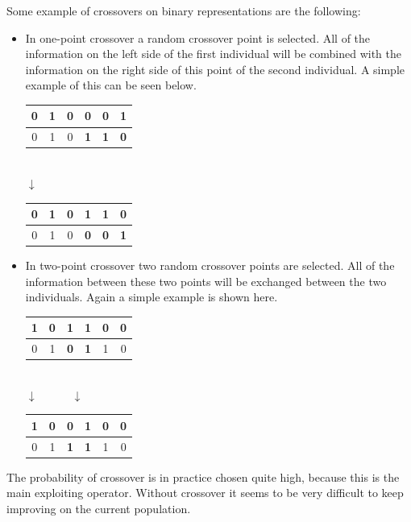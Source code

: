 Some example of crossovers on binary representations are the following:
\begin{itemize}
\item In one-point crossover a random crossover point is selected. All of the information on the left side of the first individual will be combined with the information on the right side of this point of the second individual. A simple example of this can be seen below.
\begin{center}
\begin{tabular}{|c|c|c|c|c|c|}
\hline
0 & 1 & 0 & \textbf{0} & \textbf{0} & \textbf{1} \\ \hline \hline
0 & 1 & 0 & \textbf{1} & \textbf{1} & \textbf{0} \\ \hline
\end{tabular}
\\
$\downarrow$
\\
\begin{tabular}{|c|c|c||c|c|c|}
\hline
0 & 1 & 0 & \textbf{1} & \textbf{1} & \textbf{0} \\ \hline \hline
0 & 1 & 0 & \textbf{0} & \textbf{0} & \textbf{1} \\ \hline
\end{tabular}
\end{center}
\item In two-point crossover two random crossover points are selected. All of the information between these two points will be exchanged between the two individuals. Again a simple example is shown here.
\begin{center}
\begin{tabular}{|c|c|c|c|c|c|}
\hline
1 & 0 & \textbf{1} & \textbf{1} & 0 & 0 \\ \hline \hline
0 & 1 & \textbf{0} & \textbf{1} & 1 & 0 \\ \hline
\end{tabular}
\\
$\downarrow \qquad \quad \downarrow$
\\
\begin{tabular}{|c|c||c|c||c|c|}
\hline
1 & 0 & \textbf{0} & \textbf{1} & 0 & 0 \\ \hline \hline
0 & 1 & \textbf{1} & \textbf{1} & 1 & 0 \\ \hline
\end{tabular}
\end{center}
\end{itemize}

The probability of crossover is in practice chosen quite high, because this is the main exploiting operator.
Without crossover it seems to be very difficult to keep improving on the current population.

